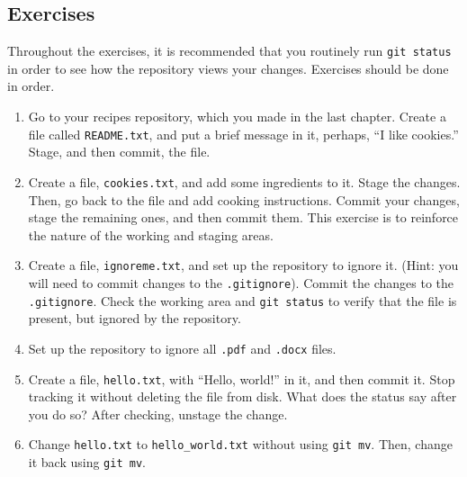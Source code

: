 \subsection{Exercises}
Throughout the exercises, it is recommended that you routinely run
\verb+git status+ in order to see how the repository views your changes.
Exercises should be done in order.
\begin{enumerate}
    \item Go to your recipes repository, which you made in the last chapter.
        Create a file called \verb+README.txt+, and put a brief message in
        it, perhaps, ``I like cookies.'' Stage, and then commit, the file.
    \item Create a file, \verb+cookies.txt+, and add some ingredients to it.
        Stage the changes.
        Then, go back to the file and add cooking instructions.
        Commit your changes, stage the remaining ones, and then commit them.
        This exercise is to reinforce the nature of the working and staging
        areas.
    \item Create a file, \verb+ignoreme.txt+, and set up the repository to
        ignore it.
        (Hint: you will need to commit changes to the \verb+.gitignore+).
        Commit the changes to the \verb+.gitignore+.
        Check the working area and \verb+git status+ to verify that the file
        is present, but ignored by the repository.
    \item Set up the repository to ignore all \verb+.pdf+ and \verb+.docx+ 
        files.
    \item Create a file, \verb+hello.txt+, with ``Hello, world!'' in it,
        and then commit it. Stop tracking it without deleting the file from
        disk.
        What does the status say after you do so?
        After checking, unstage the change.
    \item Change \verb+hello.txt+ to \verb+hello_world.txt+ without using 
        \verb+git mv+.
        Then, change it back using \verb+git mv+.
\end{enumerate}
